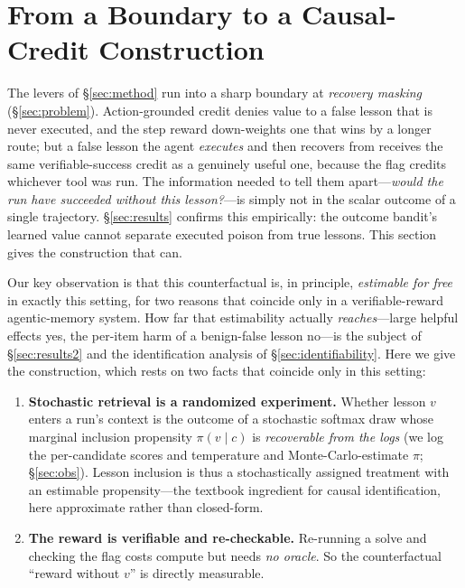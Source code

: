 
\section{From a Boundary to a Causal-Credit Construction}\label{sec:solution}
The levers of \S\ref{sec:method} run into a sharp boundary at \emph{recovery
masking} (\S\ref{sec:problem}). Action-grounded credit denies value to a false
lesson that is never executed, and the step reward down-weights one that wins by a
longer route; but a false lesson the agent \emph{executes} and then recovers from
receives the same verifiable-success credit as a genuinely useful one, because the
flag credits whichever tool was run. The information needed to tell them
apart---\emph{would the run have succeeded without this lesson?}---is simply not in
the scalar outcome of a single trajectory. \S\ref{sec:results} confirms this
empirically: the outcome bandit's learned value cannot separate executed poison from
true lessons. This section gives the construction that can.

Our key observation is that this counterfactual is, in principle, \emph{estimable for
free} in exactly this setting, for two reasons that coincide only in a verifiable-reward
agentic-memory system. How far that estimability actually \emph{reaches}---large helpful
effects yes, the per-item harm of a benign-false lesson no---is the subject of
\S\ref{sec:results2} and the identification analysis of \S\ref{sec:identifiability}. Here
we give the construction, which rests on two facts that coincide only in this setting:

\begin{enumerate}\itemsep2pt
\item \textbf{Stochastic retrieval is a randomized experiment.} Whether lesson $v$
  enters a run's context is the outcome of a stochastic softmax draw whose marginal
  inclusion propensity $\pi(v\mid c)$ is \emph{recoverable from the logs} (we log the
  per-candidate scores and temperature and Monte-Carlo-estimate $\pi$; \S\ref{sec:obs}).
  Lesson inclusion is thus a stochastically assigned treatment with an estimable
  propensity---the textbook ingredient for causal identification, here approximate
  rather than closed-form.
\item \textbf{The reward is verifiable and re-checkable.} Re-running a solve and
  checking the flag costs compute but needs \emph{no oracle}. So the counterfactual
  ``reward without $v$'' is directly measurable.
\end{enumerate}

